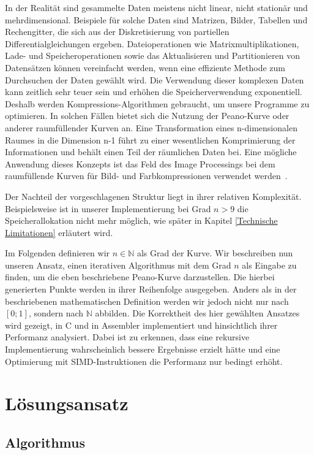 \documentclass[course=asp]{aspdoc}
\begin{document}
In der Realit\"at sind gesammelte Daten meistens nicht linear, nicht station\"ar und mehrdimensional. Beispiele f\"ur solche Daten sind Matrizen, Bilder, Tabellen und Rechengitter, die sich aus der Diskretisierung von partiellen Differentialgleichungen ergeben. Dateioperationen wie Matrixmultiplikationen, Lade- und Speicheroperationen sowie das Aktualisieren und Partitionieren von Datens\"atzen k\"onnen vereinfacht werden, wenn eine effiziente Methode zum Durchsuchen der Daten gew\"ahlt wird. Die Verwendung dieser komplexen Daten kann zeitlich sehr teuer sein und erh\"ohen die Speicherverwendung exponentiell. Deshalb werden Kompressions-Algorithmen gebraucht, um unsere Programme zu optimieren. In solchen F\"allen bietet sich die Nutzung der Peano-Kurve oder anderer raumf\"ullender Kurven an. Eine Transformation eines n-dimensionalen Raumes in die Dimension n-1 f\"uhrt zu einer wesentlichen Komprimierung der Informationen und beh\"alt einen Teil der r\"aumlichen Daten bei. Eine m\"ogliche Anwendung dieses Konzepts ist das Feld des Image Processings bei dem raumf\"ullende Kurven f\"ur Bild- und Farbkompressionen verwendet werden~\cite{imageProcessing}.

Der Nachteil der vorgeschlagenen Struktur liegt in ihrer relativen Komplexit\"at. Beispielsweise ist in unserer Implementierung bei Grad $n > 9$ die Speicherallokation nicht mehr m\"oglich, wie sp\"ater in Kapitel \ref{Technische Limitationen} erl\"autert wird.

Im Folgenden definieren wir $n \in \mathbb{N}$ als Grad der Kurve.
Wir beschreiben nun unseren Ansatz, einen iterativen Algorithmus mit dem Grad $n$ als Eingabe zu finden, um die eben beschriebene Peano-Kurve darzustellen. Die hierbei generierten Punkte werden in ihrer Reihenfolge ausgegeben. Anders als in der beschriebenen mathematischen Definition werden wir jedoch nicht nur nach $[0;1]$, sondern nach $\mathbb{N}$ abbilden.
Die Korrektheit des hier gew\"ahlten Ansatzes wird gezeigt, in C und in Assembler implementiert und hinsichtlich ihrer Performanz analysiert. Dabei ist zu erkennen, dass eine rekursive Implementierung wahrscheinlich bessere Ergebnisse erzielt h\"atte und eine Optimierung mit SIMD-Instruktionen die Performanz nur bedingt erh\"oht.

\section{L\"osungsansatz} \label{L\"osungsansatz}

\subsection{Algorithmus} \label{Algorithmus}
\end{document}
